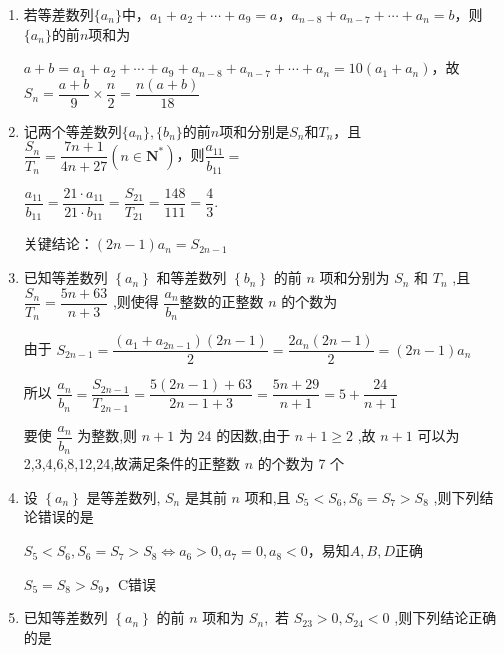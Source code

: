 \begin{enumerate}
    \item 若等差数列$\{a_n\}$中，$a_1 + a_2 + \cdots + a_9 = a$，$a_{n-8} + a_{n-7} + \cdots + a_n = b$，则$\{a_n\}$的前$n$项和为
    \begin{jieda}
        $a+b = a_1 + a_2 + \cdots + a_9 + a_{n-8} + a_{n-7} + \cdots + a_n = 10(a_1 + a_n)$，故$S_n = \dfrac{a+b}{9} \times \dfrac{n}{2} = \dfrac{n(a+b)}{18}$
    \end{jieda}
    \item 记两个等差数列$\{a_n\}, \{b_n\}$的前$n$项和分别是$S_n$和$T_n$，且$\dfrac{S_n}{T_n} = \dfrac{7n+1}{4n+27}(n \in \mathbf{N^*})$，则$\dfrac{a_{11}}{b_{11}} = $
    \begin{jieda}
        $\dfrac{a_{11}}{b_{11}} = \dfrac{21 \cdot a_{11}}{21 \cdot b_{11}} = \dfrac{S_{21}}{T_{21}} = \dfrac{148}{111} = \dfrac{4}{3}$.

        关键结论：$(2n-1)a_n = S_{2n-1}$
    \end{jieda}
    \item 已知等差数列 $\left\{  {a}_{n}\right\}$ 和等差数列 $\left\{  {b}_{n}\right\}$ 的前 $n$ 项和分别为 ${S}_{n}$ 和 ${T}_{n}$ ,且 $\dfrac{{S}_{n}}{T_n} = \dfrac{{5n} + {63}}{n + 3}$ ,则使得 $\dfrac{a_n}{b_n}$整数的正整数 $n$ 的个数为 
    \begin{jieda}
        由于 ${S}_{{2n} - 1} = \dfrac{\left( {{a}_{1} + {a}_{{2n} - 1}}\right) \left( {{2n} - 1}\right) }{2} = \dfrac{2{a}_{n}\left( {{2n} - 1}\right) }{2} = \left( {{2n} - 1}\right) {a}_{n}$
        
        所以 $\dfrac{{a}_{n}}{{b}_{n}} = \dfrac{{S}_{{2n} - 1}}{{T}_{{2n} - 1}} = \dfrac{5\left( {{2n} - 1}\right)  + {63}}{{2n} - 1 + 3} = \dfrac{{5n} + {29}}{n + 1} = 5 + \dfrac{24}{n + 1}$ 
        
        要使 $\dfrac{{a}_n}{b_n}$ 为整数,则 $n + 1$ 为 24 的因数,由于 $n + 1 \geq  2$ ,故 $n + 1$ 可以为2,3,4,6,8,12,24,故满足条件的正整数 $n$ 的个数为 7 个
    \end{jieda}
    \item 设 $\left\{  {a}_{n}\right\}$ 是等差数列, ${S}_{n}$ 是其前 $n$ 项和,且 ${S}_{5} < {S}_{6},{S}_{6} = {S}_{7} > {S}_{8}$ ,则下列结论错误的是 
    \begin{jieda}
        ${S}_{5} < {S}_{6},{S}_{6} = {S}_{7} > {S}_{8} \Longleftrightarrow a_6 > 0, a_7 = 0, a_8 < 0$，易知$A,B,D$正确

        $S_5 = S_8 > S_9$，C错误
    \end{jieda}
    
    \item 已知等差数列 $\left\{  {a}_{n}\right\}$ 的前 $n$ 项和为 ${S}_{n},$ 若 ${S}_{23} > 0,{S}_{24} < 0$ ,则下列结论正确的是 
\end{enumerate}

